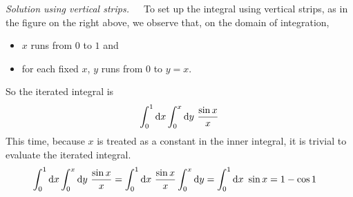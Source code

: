 \begin{eg}
\medskip\noindent\emph{Solution using vertical strips.}\ \ \
To set up the integral using vertical strips, as in the figure on
the right above, we observe that, on the domain of integration,
\begin{itemize}
\item
$x$ runs from $0$ to $1$ and
\item
for each fixed $x$, $y$ runs from $0$ to $y=x$.
\end{itemize}
So the iterated integral is
\begin{equation*}
\int_0^1\mathrm{d}x\int_0^x\mathrm{d}y\ \frac{\sin x}{x}
\end{equation*}
This time, because $x$ is treated as a constant in the inner integral,
it is trivial to evaluate the iterated integral.
\begin{align*}
\int_0^1\mathrm{d}x\int_0^x\mathrm{d}y\ \frac{\sin x}{x}
&=\int_0^1\mathrm{d}x\ \frac{\sin x}{x}\int_0^x\mathrm{d}y
=\int_0^1\mathrm{d}x\ \sin x
=1-\cos 1
\end{align*}
\end{eg}

